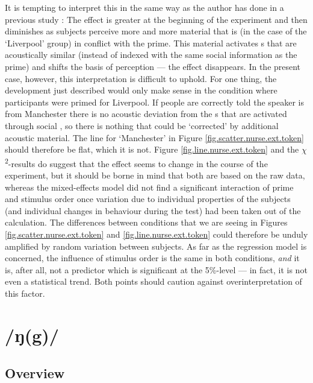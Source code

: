 It is tempting to interpret this in the same way as the author has done in a previous study \parencite[cf.][]{juskanma}: The  effect is greater at the beginning of the experiment and then diminishes as subjects perceive more and more material that is (in the case of the `Liverpool' group) in conflict with the prime.
This material activates s that are acoustically similar (instead of indexed with the same social information as the prime) and shifts the basis of perception --- the  effect disappears.
In the present case, however, this interpretation is difficult to uphold.
For one thing, the development just described would only make sense in the condition where participants were primed for Liverpool.
If people are correctly told the speaker is from Manchester there is no acoustic deviation from the s that are activated through social , so there is nothing that could be `corrected' by additional acoustic material.
The line for `Manchester' in Figure \ref{fig.scatter.nurse.ext.token} should therefore be flat, which it is not.
Figure \ref{fig.line.nurse.ext.token} and the \(\chi\)\textsuperscript{2}-results do suggest that the  effect seems to change in the course of the experiment, but it should be borne in mind that both are based on the raw data, whereas the mixed-effects model did not find a significant interaction of prime and stimulus order once variation due to individual properties of the subjects (and individual changes in behaviour during the test) had been taken out of the calculation.
The differences between conditions that we are seeing in Figures \ref{fig.scatter.nurse.ext.token} and \ref{fig.line.nurse.ext.token} could therefore be unduly amplified by random variation between subjects.
As far as the regression model is concerned, the influence of stimulus order is the same in both conditions, \emph{and} it is, after all, not a predictor which is significant at the 5\%-level --- in fact, it is not even a statistical trend.
Both points should caution against overinterpretation of this factor.


\section{/ŋ(g)/}
\label{sec.perc_res.ng}
	\subsection{Overview}
	\label{sec.perc_res.ng.overview}

